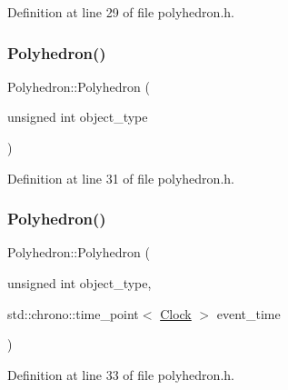 Definition at line 29 of file polyhedron.\+h.

\mbox{\label{class_polyhedron_a304950efef7fb67203d8136578b42535}} 
\subsubsection{\texorpdfstring{Polyhedron()}{Polyhedron()}\hspace{0.1cm}{\footnotesize\ttfamily [2/4]}}
{\footnotesize\ttfamily Polyhedron\+::\+Polyhedron (\begin{DoxyParamCaption}\item[{unsigned int}]{object\+\_\+type }\end{DoxyParamCaption})\hspace{0.3cm}{\ttfamily [inline]}}



Definition at line 31 of file polyhedron.\+h.

\mbox{\label{class_polyhedron_a29a4fff595cdb6a557e5f62255e61192}} 
\subsubsection{\texorpdfstring{Polyhedron()}{Polyhedron()}\hspace{0.1cm}{\footnotesize\ttfamily [3/4]}}
{\footnotesize\ttfamily Polyhedron\+::\+Polyhedron (\begin{DoxyParamCaption}\item[{unsigned int}]{object\+\_\+type,  }\item[{std\+::chrono\+::time\+\_\+point$<$ \hyperlink{universe_8h_a0ef8d951d1ca5ab3cfaf7ab4c7a6fd80}{Clock} $>$}]{event\+\_\+time }\end{DoxyParamCaption})\hspace{0.3cm}{\ttfamily [inline]}}



Definition at line 33 of file polyhedron.\+h.

\mbox{\label{class_polyhedron_af5bb1d2a6b04502dfdbfc9f04aafc950}} 
